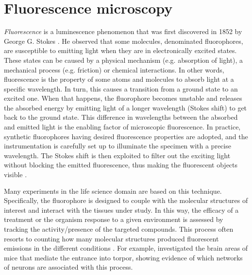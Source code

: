 \section{Fluorescence microscopy 
}
\label{sec:fluorescence_microscopy}

\emph{Fluorescence} is a luminescence phenomenon that was first discovered in 1852 by George G. Stokes \cite{stokes2010memoir}. 
He observed that some molecules, denominated fluorophores, are susceptible to emitting light when they are in electronically excited states. These states can be caused by a physical mechanism (e.g. absorption of light), a mechanical process (e.g. friction) or chemical interactions.
In other words, fluorescence is the property of some atoms and molecules to absorb light at a specific wavelength. In turn, this causes a transition from a ground state to an excited one. When that happens, the fluorophore becomes unstable and releases the absorbed energy by emitting light of a longer wavelength (Stokes shift) to get back to the ground state.
This difference in wavelengths between the absorbed and emitted light is the enabling factor of microscopic fluorescence. 
In practice, synthetic fluorophores having desired fluorescence properties are adopted, and the 
instrumentation is carefully set up to illuminate the specimen with a precise wavelength. The Stokes shift is then exploited to filter out the exciting light without blocking the emitted fluorescence, thus making the fluorescent objects visible \cite{lichtman2005fluorescence}.

Many experiments in the life science domain are based on this technique.
Specifically, the fluorophore is designed to couple with the molecular structures of interest and interact with the tissues under study. 
In this way, the efficacy of a treatment or the organism response to a given environment is assessed by tracking the activity/presence of the targeted compounds. 
This process often resorts to counting how many molecular structures produced fluorescent emissions in the different conditions \cite{hitrec2019neural, hitrec2021reversible, da2020median}.
For example,  investigated the brain areas of mice that mediate the entrance into torpor, showing evidence of which networks of neurons are associated with this process.

